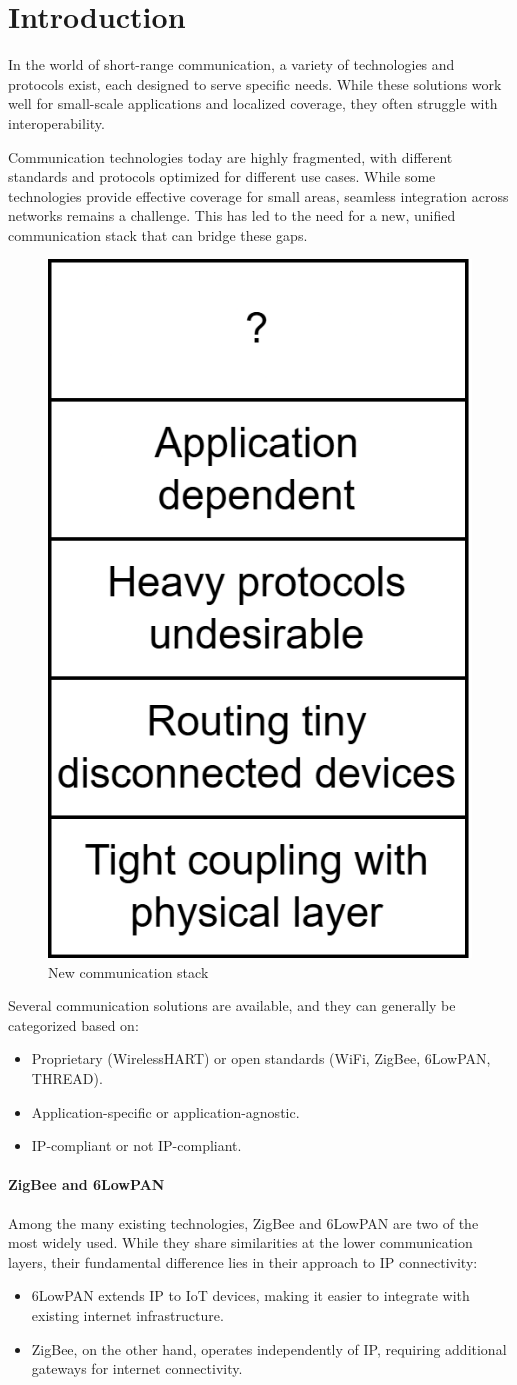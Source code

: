 \section{Introduction}

In the world of short-range communication, a variety of technologies and protocols exist, each designed to serve specific needs. 
While these solutions work well for small-scale applications and localized coverage, they often struggle with interoperability.

Communication technologies today are highly fragmented, with different standards and protocols optimized for different use cases. 
While some technologies provide effective coverage for small areas, seamless integration across networks remains a challenge. 
This has led to the need for a new, unified communication stack that can bridge these gaps.
\begin{figure}[H]
    \centering
    \includegraphics[width=0.25\linewidth]{images/iot13.png}
    \caption{New communication stack}
\end{figure}
\noindent Several communication solutions are available, and they can generally be categorized based on:
\begin{itemize}
    \item Proprietary (WirelessHART) or open standards (WiFi, ZigBee, 6LowPAN, THREAD). 
    \item Application-specific or application-agnostic. 
    \item IP-compliant or not IP-compliant. 
\end{itemize}

\paragraph*{ZigBee and 6LowPAN}
Among the many existing technologies, ZigBee and 6LowPAN are two of the most widely used.
While they share similarities at the lower communication layers, their fundamental difference lies in their approach to IP connectivity:
\begin{itemize}
    \item 6LowPAN extends IP to IoT devices, making it easier to integrate with existing internet infrastructure.
    \item ZigBee, on the other hand, operates independently of IP, requiring additional gateways for internet connectivity.
\end{itemize}